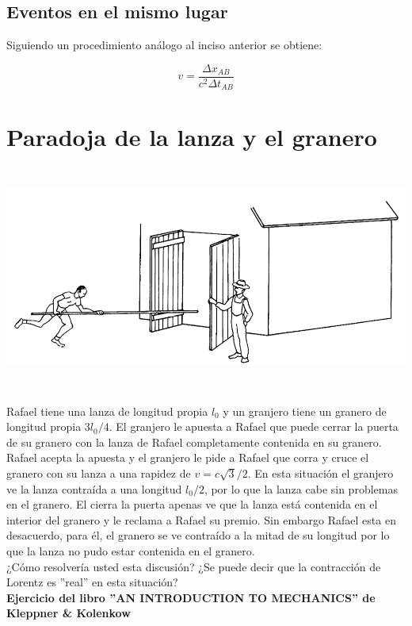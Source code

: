 \documentclass[12pt]{article}
\begin{document}
\subsection{Eventos en el mismo lugar}

Siguiendo un procedimiento análogo al inciso anterior se obtiene:

\begin{equation}
v  = \frac{\Delta x_{AB}}{c^2\Delta t_{AB}}  
\end{equation}



 \section{Paradoja de la lanza y el granero} 
 

 
 \includegraphics[height=7.4cm]{1}
 
 Rafael tiene una lanza de longitud propia $l_0$ y  un granjero tiene un granero de longitud propia $3 l_0/4$. El granjero le apuesta a Rafael que puede cerrar la puerta de su granero con la lanza de Rafael completamente contenida en su granero. Rafael acepta la apuesta y el granjero le pide a Rafael que corra y  cruce el granero con su lanza a una rapidez de $v = c \sqrt{3}/2$. En esta situación el granjero ve la lanza contraída a una longitud $l_0/2$, por lo que la lanza cabe sin problemas en el granero. El cierra la puerta apenas ve que la lanza está contenida en el interior del granero y le reclama a Rafael su premio. Sin embargo Rafael esta en desacuerdo, para él, el granero se ve contraído a la mitad de su longitud por lo que la lanza no pudo estar contenida en el granero.\\
 
  
 ¿Cómo resolvería usted esta discusión? ¿Se puede decir que la contracción de Lorentz es ''real'' en esta situación?\\

\textbf{Ejercicio del libro ''AN INTRODUCTION TO MECHANICS'' de Kleppner \& Kolenkow}
\end{document}
